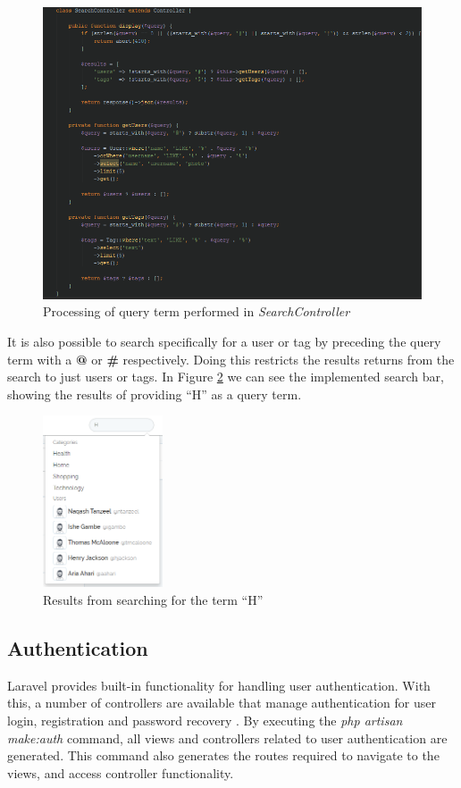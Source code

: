 \begin{figure}[H]
\centering
\includegraphics[width=1\textwidth]{Images/Implementation/SearchController}
\caption{Processing of query term performed in \textit{SearchController}}
\label{fig:SearchController}
\end{figure}

It is also possible to search specifically for a user or tag by preceding the query term with a \textbf{@} or \textbf{\#} respectively. Doing this restricts the results returns from the search to just users or tags. In Figure \ref{fig:SearchResults} we can see the implemented search bar, showing the results of providing ``H'' as a query term.

\begin{figure}[H]
\centering
\includegraphics[height=2in]{Images/Implementation/SearchResults}
\caption{Results from searching for the term ``H''}
\label{fig:SearchResults}
\end{figure}

\subsection{Authentication}
Laravel provides built-in functionality for handling user authentication. With this, a number of controllers are available that manage authentication for user login, registration and password recovery \cite{Laravel:Authentication}. By executing the \textit{php artisan make:auth} command, all views and controllers related to user authentication are generated. This command also generates the routes required to navigate to the views, and access controller functionality.

